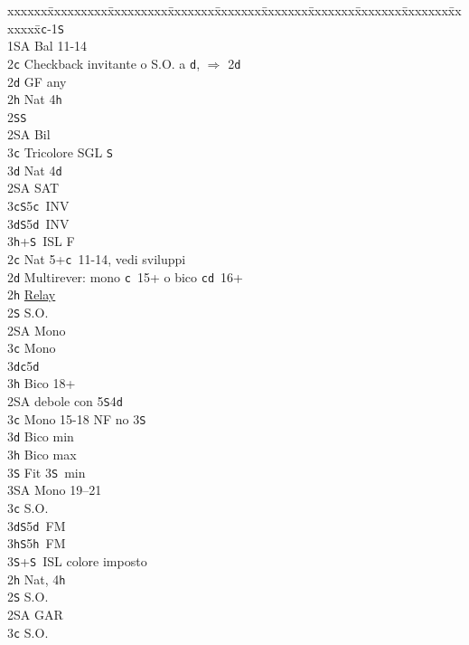 \documentclass[a4paper,italian]{article}
\newcommand{\BS}{\small{\texttt{S}}}
\newcommand{\BC}{\small{\texttt{c}}}
\newcommand{\BD}{\small{\texttt{d}}}
\newcommand{\BH}{\small{\texttt{h}}}
\newenvironment{bidtable}
{\begin{tabbing}

    xxxxxx\=xxxxxxxxx\=xxxxxxxxx\=xxxxxxx\=xxxxxxx\=xxxxxxx\=xxxxxxx\=xxxxxxx\=xxxxxxx\=xxxxxxx\=\kill}
{\end{tabbing} }%
\begin{document}
\begin{multicols}{2}
    \begin{bidtable}
        1\BC-1\BS\+\\
        1\small{SA} \> Bal 11-14\+\\
        2\BC \> Checkback invitante o S.O. a \BD , $\Rightarrow$ 2\BD \\
        2\BD \> GF any\+\\
        2\BH \> Nat 4\BH \\
        2\BS {}\BS \\
        2\small{SA} \> Bil\\
        3\BC \> Tricolore SGL \BS \\
        3\BD \> Nat 4\BD \-\\
        2\small{SA} \small{SA}T\\
        3\BC {}\BS 5\BC\ INV\\
        3\BD {}\BS 5\BD\ INV\\
        3\BH {}+\BS\ ISL F\-\\
        2\BC \> Nat 5+\BC\ 11-14, vedi sviluppi\\
        2\BD \> Multirever: mono \BC\ 15+ o bico \BC \BD\ 16+\+\\
        2\BH \> \hyperref[multirever]{Relay}\\
        2\BS \> S.O.\+\\
        2\small{SA}\> Mono\\
        3\BC \> Mono\\
        3\BD {}\BC 5\BD \\
        3\BH \> Bico 18+\-\\
        2\small{SA} \> debole con 5\BS 4\BD \+\\
        3\BC \> Mono 15-18 NF no 3\BS\\
        3\BD \> Bico min\\
        3\BH \> Bico max\\
        3\BS \> Fit 3\BS\ min\\
        3\small{SA} \> Mono 19--21\-\\
        3\BC \> S.O.\\
        3\BD {}\BS 5\BD\ FM\\
        3\BH {}\BS 5\BH\ FM\\
        3\BS {}+\BS\ ISL colore imposto\-\\
        2\BH \> Nat, 4\BH \+\\
        2\BS \> S.O.\\
        2\small{SA} \> GAR\\
        3\BC \> S.O.\\

\end{bidtable}
\end{multicols}
\end{document}
